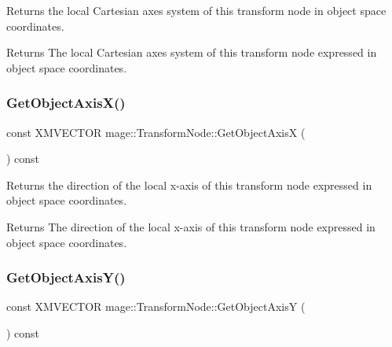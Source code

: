 Returns the local Cartesian axes system of this transform node in object space coordinates.

\begin{DoxyReturn}{Returns}
The local Cartesian axes system of this transform node expressed in object space coordinates. 
\end{DoxyReturn}
\hypertarget{structmage_1_1_transform_node_a0e31d129c0a6524a612ce28db24f0600}{}\label{structmage_1_1_transform_node_a0e31d129c0a6524a612ce28db24f0600} 
\subsubsection{\texorpdfstring{Get\+Object\+Axis\+X()}{GetObjectAxisX()}}
{\footnotesize\ttfamily const X\+M\+V\+E\+C\+T\+OR mage\+::\+Transform\+Node\+::\+Get\+Object\+AxisX (\begin{DoxyParamCaption}{ }\end{DoxyParamCaption}) const\hspace{0.3cm}{\ttfamily [noexcept]}}

Returns the direction of the local x-\/axis of this transform node expressed in object space coordinates.

\begin{DoxyReturn}{Returns}
The direction of the local x-\/axis of this transform node expressed in object space coordinates. 
\end{DoxyReturn}
\hypertarget{structmage_1_1_transform_node_ad595911b6df1898a49263eb8e201d00c}{}\label{structmage_1_1_transform_node_ad595911b6df1898a49263eb8e201d00c} 
\subsubsection{\texorpdfstring{Get\+Object\+Axis\+Y()}{GetObjectAxisY()}}
{\footnotesize\ttfamily const X\+M\+V\+E\+C\+T\+OR mage\+::\+Transform\+Node\+::\+Get\+Object\+AxisY (\begin{DoxyParamCaption}{ }\end{DoxyParamCaption}) const\hspace{0.3cm}{\ttfamily [noexcept]}}

